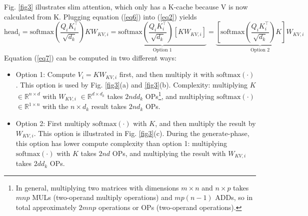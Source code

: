 \documentclass{article}
\newcommand{\eR}[2]{$\in \mathbb{R}^{#1 \times #2}$} %
\begin{document}
Fig. \ref{fig3} illustrates slim attention, which only has a K-cache because V is now calculated from K. Plugging equation (\ref{eq6}) into (\ref{eq2}) yields
\begin{equation}
  \text{head}_i = \text{softmax} \left( \frac{Q_i K_i^\top}{\sqrt{d_k}} \right) K W_{KV,i}
  = \underbrace{ \text{softmax} \left( \frac{Q_i K_i^\top}{\sqrt{d_k}} \right) \left[ K W_{KV,i} \right] }_{\text{Option 1}}
  = \underbrace{ \left[ \text{softmax} \left( \frac{Q_i K_i^\top}{\sqrt{d_k}} \right) K \right] W_{KV,i} }_{\text{Option 2}}
\label{eq7} \end{equation}
Equation (\ref{eq7}) can be computed in two different ways:
\begin{itemize}[topsep=-1pt, itemsep=-1pt]
  \item Option 1: Compute $V_i = K W_{KV,i}$ first, and then multiply it with $\text{softmax}(\cdot)$. This option is used by Fig. \ref{fig3}(a) and \ref{fig3}(b). Complexity: multiplying $K$ \eR{n}{d} with $W_{KV,i}$ \eR{d}{d_k} takes $2 n d d_k$ OPs\footnote{In general, multiplying two matrices with dimensions $m \times n$ and $n \times p$ takes $mnp$ MULs (two-operand multiply operations) and $mp(n-1)$ ADDs, so in total approximately $2mnp$ operations or OPs (two-operand operations).}, and multiplying $\text{softmax}(\cdot)$ \eR{1}{n} with the $n \times d_k$ result takes $2 n d_k$ OPs.
  \item Option 2: First multiply $\text{softmax}(\cdot)$ with $K$, and then multiply the result by $W_{KV,i}$.  This option is illustrated in Fig. \ref{fig3}(c). During the generate-phase, this option has lower compute complexity than option 1: multiplying $\text{softmax}(\cdot)$ with $K$ takes $2nd$ OPs, and multiplying the result with $W_{KV,i}$ takes $2dd_k$ OPs.
\end{itemize}
\end{document}
